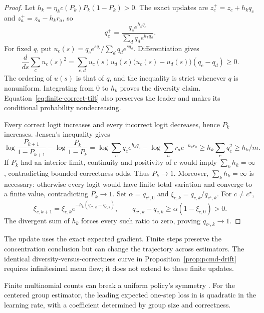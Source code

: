 \begin{proof}
\enforcehalffinalproseline
Let $h_k=\eta_kc(P_k)P_k(1-P_k)>0$. The exact updates are
$z_c^+=z_c+h_kq_c$ and $z_a^+=z_a-h_kr_a$, so
\begin{equation}
 q_c^+=\frac{q_c e^{h_kq_c}}{\sum_dq_d e^{h_kq_d}}.
 \label{eq:finite-correct-tilt}
\end{equation}
For fixed $q$, put $u_c(s)=q_ce^{sq_c}/\sum_dq_de^{sq_d}$.
Differentiation gives
\[
 \frac{d}{ds}\sum_cu_c(s)^2
 =\sum_{c,d}u_c(s)u_d(s)
       \big(u_c(s)-u_d(s)\big)(q_c-q_d)\ge0.
\]
The ordering of $u(s)$ is that of $q$, and the inequality is strict whenever
$q$ is nonuniform. Integrating from $0$ to $h_k$ proves the diversity claim.
Equation~\eqref{eq:finite-correct-tilt} also preserves the leader and makes
its conditional probability nondecreasing.

Every correct logit increases and every incorrect logit decreases, hence
$P_k$ increases. Jensen's inequality gives
\[
 \log\frac{P_{k+1}}{1-P_{k+1}}-\log\frac{P_k}{1-P_k}
 =\log\sum_cq_c e^{h_kq_c}-\log\sum_ar_a e^{-h_kr_a}
 \ge h_k\sum_cq_c^2\ge h_k/m.
\]
If $P_k$ had an interior limit, continuity and positivity of $c$ would imply
$\sum_kh_k=\infty$, contradicting bounded correctness odds. Thus $P_k\to1$.
Moreover, $\sum_kh_k=\infty$ is necessary: otherwise every logit would have
finite total variation and converge to a finite value, contradicting
$P_k\to1$.
Set $\alpha=q_{c^\star,0}$ and
$\xi_{c,k}=q_{c,k}/q_{c^\star,k}$. For $c\ne c^\star$,
\[
 \xi_{c,k+1}=\xi_{c,k}
  e^{-h_k(q_{c^\star,k}-q_{c,k})},
 \qquad
 q_{c^\star,k}-q_{c,k}
 \ge\alpha(1-\xi_{c,0})>0.
\]
The divergent sum of $h_k$ forces every such ratio to zero, proving
$q_{c^\star,k}\to1$.
\end{proof}

The update uses the exact expected gradient. Finite steps preserve the
concentration conclusion but can change the trajectory across estimators.
The identical diversity-versus-correctness curve in
Proposition~\ref{prop:pcmd-drift} requires infinitesimal mean flow;
it does not extend to these finite updates.

Finite multinomial counts can break a uniform policy's symmetry
\citep[Proposition~A.1]{lochab2026ucpo}. For the centered group estimator,
the leading expected one-step loss in \pmd{} is quadratic in the learning
rate, with a coefficient determined by group size and correctness.

